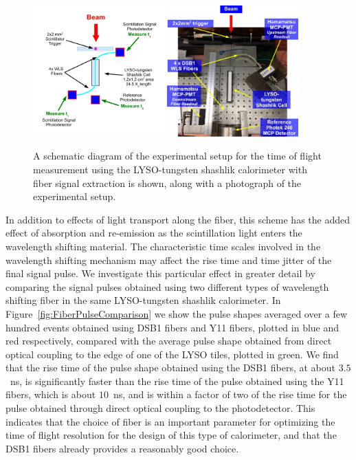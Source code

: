 \documentclass[12pt]{article}
\begin{document}
\begin{figure}[h] \centering
\includegraphics[width=0.45\textwidth]{figs/ShashlikFiberSetupSchematic} 
\includegraphics[width=0.45\textwidth]{figs/ShashlikFiberSetupPhoto} 
\caption{ A schematic diagram of the experimental setup for the
time of flight measurement using the LYSO-tungsten shashlik calorimeter
with fiber signal extraction is shown, along with a photograph of the
experimental setup. } 
\label{fig:ShashlikFiberSetup}
\end{figure}

In addition to effects of light transport along the fiber, 
this scheme has the added effect of absorption and re-emission as 
the scintillation light enters the wavelength shifting material. 
The characteristic time scales involved in the wavelength shifting 
mechanism may affect the rise time and time jitter of the final signal 
pulse. We investigate this particular effect in greater detail by
comparing the signal pulses obtained using two different types
of wavelength shifting fiber in the same LYSO-tungsten shashlik
calorimeter. In Figure~\ref{fig:FiberPulseComparison} we show
the pulse shapes averaged over a few hundred events obtained 
using DSB1 fibers and Y11 fibers, plotted in blue and red respectively,
compared with the average pulse shape obtained from direct optical 
coupling to the edge of one of the LYSO tiles, plotted in green.
We find that the rise time of the pulse shape obtained using the 
DSB1 fibers, at about $3.5$~ns, is significantly faster than the rise time
of the pulse obtained using the Y11 fibers, which is about $10$~ns,
and is within a factor of two of the rise time for the pulse obtained 
through direct optical coupling to the photodetector. This indicates
that the choice of fiber is an important parameter for 
optimizing the time of flight resolution for the design of 
this type of calorimeter, and that the DSB1 fibers 
already provides a reasonably good choice.
\end{document}
